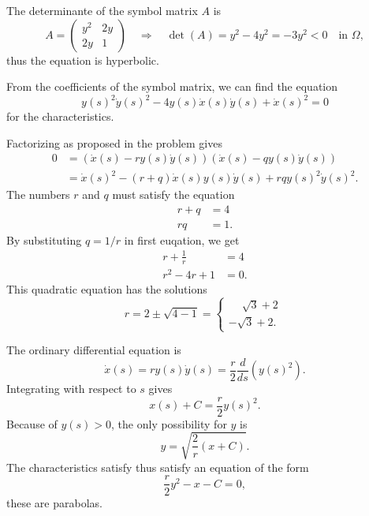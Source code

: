 \begin{loesung}
\begin{teilaufgaben}
\item
The determinante of the symbol matrix $A$ is
\[
A=\begin{pmatrix}
y^2&2y\\
2y&1
\end{pmatrix}
\quad\Rightarrow\quad
\det (A)=y^2-4y^2=-3y^2<0 \quad\text{in $\Omega$},
\]
thus the equation is hyperbolic.
\item
From the coefficients of the symbol matrix, we can find the equation
\[
y(s)^2\dot y(s)^2-4y(s)\dot x(s)\dot y(s)+\dot x(s)^2=0
\]
for the characteristics.
\item
Factorizing as proposed in the problem gives
\begin{align*}
0&=(\dot x(s)-ry(s)\dot y(s))(\dot x(s)-qy(s)\dot y(s))
\\
&=\dot x(s)^2-(r+q)\dot x(s) y(s)\dot y(s)+rqy(s)^2\dot y(s)^2.
\end{align*}
The numbers $r$ and $q$ must satisfy the equation
\begin{align*}
r+q&=4\\
rq&=1.
\end{align*}
By substituting
$q=1/r$ in first euqation, we get
\begin{align*}
r+\frac1r&=4\\
r^2-4r+1&=0.
\end{align*}
This quadratic equation has the solutions
\begin{equation}
r
=
2\pm\sqrt{4-1}
=
\begin{cases}
\phantom{-}\sqrt{3}+2\phantom{.}\\
         - \sqrt{3}+2.
\end{cases}
\label{90000001:r}
\end{equation}
\item
The ordinary differential equation is
\[
\dot x(s)=ry(s)\dot y(s)=\frac{r}{2}\frac{d}{ds}(y(s)^2).
\]
Integrating with respect to $s$ gives
\[
x(s) + C=\frac{r}{2}y(s)^2.
\]
Because of $y(s)>0$, the only possibility for $y$ is
\[
y = \sqrt{\frac{2}{r}(x+C)}.
\]
The characteristics satisfy thus satisfy an equation of the form
\begin{equation}
\frac{r}2y^2-x-C=0,
\label{90000001:parabola}
\end{equation}
these are parabolas.
\end{teilaufgaben}
\begin{figure}
\centering
{}

\end{figure}
\end{loesung}
